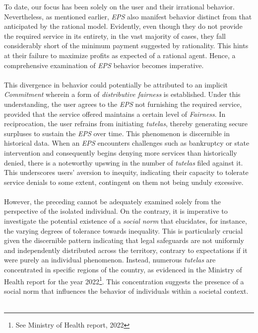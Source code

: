 \documentclass[12pt]{article}
\begin{document}
\begin{flushleft}
    To date, our focus has been solely on the user and their irrational behavior. Nevertheless, as mentioned earlier, \textit{EPS} also manifest behavior distinct from that anticipated by the rational model. Evidently, even though they do not provide the required service in its entirety, in the vast majority of cases, they fall considerably short of the minimum payment suggested by rationality. This hints at their failure to maximize profits as expected of a rational agent. Hence, a comprehensive examination of \textit{EPS} behavior becomes imperative.\\~\\

    This divergence in behavior could potentially be attributed to an implicit \textit{Commitment} wherein a form of \textit{distributive fairness} is established. Under this understanding, the user agrees to the \textit{EPS} not furnishing the required service, provided that the service offered maintains a certain level of \textit{Fairness}. In reciprocation, the user refrains from initiating \textit{tutelas}, thereby generating secure surpluses to sustain the \textit{EPS} over time. This phenomenon is discernible in historical data. When an \textit{EPS} encounters challenges such as bankruptcy or state intervention and consequently begins denying more services than historically denied, there is a noteworthy upswing in the number of \textit{tutelas} filed against it. This underscores users' aversion to inequity, indicating their capacity to tolerate service denials to some extent, contingent on them not being unduly excessive.\\~\\

    However, the preceding cannot be adequately examined solely from the perspective of the isolated individual. On the contrary, it is imperative to investigate the potential existence of a \textit{social norm} that elucidates, for instance, the varying degrees of tolerance towards inequality. This is particularly crucial given the discernible pattern indicating that legal safeguards are not uniformly and independently distributed across the territory, contrary to expectations if it were purely an individual phenomenon. Instead, numerous \textit{tutelas} are concentrated in specific regions of the country, as evidenced in the Ministry of Health report for the year 2022\footnote{See Ministry of Health report, 2022}. This concentration suggests the presence of a social norm that influences the behavior of individuals within a societal context.\\~\\


\end{flushleft}
\end{document}
